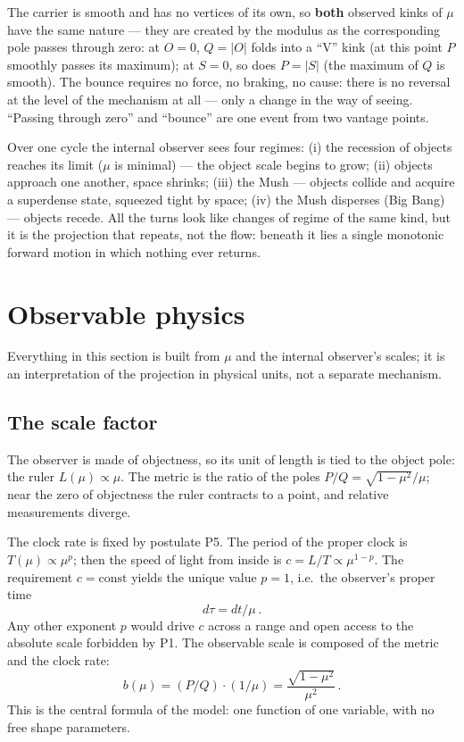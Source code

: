 \documentclass{article}
\begin{document}
The carrier is smooth and has no vertices of its own, so \textbf{both} observed kinks of $\mu$ have the same nature --- they are created by the modulus as the corresponding pole passes through zero: at $O = 0$, $Q = |O|$ folds into a ``V'' kink (at this point $P$ smoothly passes its maximum); at $S = 0$, so does $P = |S|$ (the maximum of $Q$ is smooth). The bounce requires no force, no braking, no cause: there is no reversal at the level of the mechanism at all --- only a change in the way of seeing. ``Passing through zero'' and ``bounce'' are one event from two vantage points.

Over one cycle the internal observer sees four regimes: (i) the recession of objects reaches its limit ($\mu$ is minimal) --- the object scale begins to grow; (ii) objects approach one another, space shrinks; (iii) the Mush --- objects collide and acquire a superdense state, squeezed tight by space; (iv) the Mush disperses (Big Bang) --- objects recede. All the turns look like changes of regime of the same kind, but it is the projection that repeats, not the flow: beneath it lies a single monotonic forward motion in which nothing ever returns.
\section{Observable physics}

Everything in this section is built from $\mu$ and the internal observer's scales; it is an interpretation of the projection in physical units, not a separate mechanism.

\subsection{The scale factor}

The observer is made of objectness, so its unit of length is tied to the object pole: the ruler $L(\mu) \propto \mu$. The metric is the ratio of the poles $P/Q = \sqrt{1 - \mu^2}/\mu$; near the zero of objectness the ruler contracts to a point, and relative measurements diverge.

The clock rate is fixed by postulate P5. The period of the proper clock is $T(\mu) \propto \mu^p$; then the speed of light from inside is $c = L/T \propto \mu^{1-p}$. The requirement $c = \text{const}$ yields the unique value $p = 1$, i.e.\ the observer's proper time
\begin{equation}
d\tau = dt / \mu\,.
\end{equation}
Any other exponent $p$ would drive $c$ across a range and open access to the absolute scale forbidden by P1. The observable scale is composed of the metric and the clock rate:
\begin{equation}
b(\mu) = (P/Q)\cdot(1/\mu) = \frac{\sqrt{1 - \mu^2}}{\mu^2}\,.
\end{equation}
This is the central formula of the model: one function of one variable, with no free shape parameters.
\end{document}
